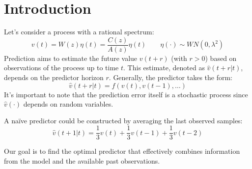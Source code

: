 \section{Introduction}

Let's consider a process with a rational spectrum:
\[v(t)=W(z)\eta(t)=\dfrac{C(z)}{A(z)}\eta(t) \qquad \eta(\cdot)\sim WN(0,\lambda^2)\]
Prediction aims to estimate the future value $v(t+r)$ (with $r>0$) based on observations of the process up to time $t$.
This estimate, denoted as $\hat{v}(t+r|t)$, depends on the predictor horizon $r$. 
Generally, the predictor takes the form:
\[\hat{v}(t+r|t)=f\left( v(t),v(t-1),\dots \right)\]
It's important to note that the prediction error itself is a stochastic process since $\hat{v}(\cdot)$ depends on random variables.
\begin{example}
    A naïve predictor could be constructed by averaging the last observed samples:
    \[\hat{v}(t+1|t)=\dfrac{1}{3}v(t)+\dfrac{1}{3}v(t-1)+\dfrac{1}{3}v(t-2)\]
\end{example}
Our goal is to find the optimal predictor that effectively combines information from the model and the available past observations. 

